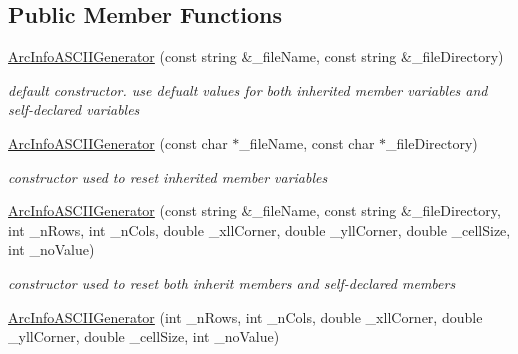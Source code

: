 \subsection*{\-Public \-Member \-Functions}
\begin{DoxyCompactItemize}
\item 
\hyperlink{classArcInfoASCIIGenerator_ab0c7642cbf52bf5e86a66da76922bd43}{\-Arc\-Info\-A\-S\-C\-I\-I\-Generator} (const string \&\-\_\-file\-Name, const string \&\-\_\-file\-Directory)
\begin{DoxyCompactList}\small\item\em default constructor. use defualt values for both inherited member variables and self-\/declared variables \end{DoxyCompactList}\item 
\hypertarget{classArcInfoASCIIGenerator_a7de403bda7b658d45b94124c77ab9cc9}{\hyperlink{classArcInfoASCIIGenerator_a7de403bda7b658d45b94124c77ab9cc9}{\-Arc\-Info\-A\-S\-C\-I\-I\-Generator} (const char $\ast$\-\_\-file\-Name, const char $\ast$\-\_\-file\-Directory)}\label{classArcInfoASCIIGenerator_a7de403bda7b658d45b94124c77ab9cc9}

\begin{DoxyCompactList}\small\item\em constructor used to reset inherited member variables \end{DoxyCompactList}\item 
\hypertarget{classArcInfoASCIIGenerator_af4c006ea239d4427b3ab1bcb86704bd0}{\hyperlink{classArcInfoASCIIGenerator_af4c006ea239d4427b3ab1bcb86704bd0}{\-Arc\-Info\-A\-S\-C\-I\-I\-Generator} (const string \&\-\_\-file\-Name, const string \&\-\_\-file\-Directory, int \-\_\-n\-Rows, int \-\_\-n\-Cols, double \-\_\-xll\-Corner, double \-\_\-yll\-Corner, double \-\_\-cell\-Size, int \-\_\-no\-Value)}\label{classArcInfoASCIIGenerator_af4c006ea239d4427b3ab1bcb86704bd0}

\begin{DoxyCompactList}\small\item\em constructor used to reset both inherit members and self-\/declared members \end{DoxyCompactList}\item 
\hypertarget{classArcInfoASCIIGenerator_ae1cb5e813f12493afa5e94a65827488b}{\hyperlink{classArcInfoASCIIGenerator_ae1cb5e813f12493afa5e94a65827488b}{\-Arc\-Info\-A\-S\-C\-I\-I\-Generator} (int \-\_\-n\-Rows, int \-\_\-n\-Cols, double \-\_\-xll\-Corner, double \-\_\-yll\-Corner, double \-\_\-cell\-Size, int \-\_\-no\-Value)}\label{classArcInfoASCIIGenerator_ae1cb5e813f12493afa5e94a65827488b}


\end{DoxyCompactItemize}
